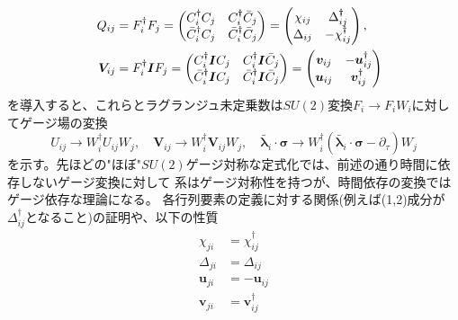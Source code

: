 \documentclass[11pt, aps, longbibliography]{article}
\begin{document}
        \begin{align}\label{eq:highS-MF-16}
            Q_{ij} &= F_i^\dagger F_j =\begin{pmatrix}
                C_i^\dagger C_j & C_i^\dagger\bar{C}_j \\
                \bar{C}_i^\dagger C_j & \bar{C}_i^\dagger \bar{C}_j
            \end{pmatrix} = \begin{pmatrix}
                \chi_{ij} & \Delta^\dagger_{ij} \\
                \Delta_{ij} & -\chi^\dagger_{ij}
            \end{pmatrix}, \notag \\
            \quad \boldsymbol{V}_{ij} &= F_i^\dagger \boldsymbol{I}F_j = \begin{pmatrix}
                C_i^\dagger \boldsymbol{I}C_j & C_i^\dagger \boldsymbol{I}\bar{C}_j \\
                \bar{C}_i^\dagger \boldsymbol{I}C_j & \bar{C}_i^\dagger \boldsymbol{I}\bar{C}_j
            \end{pmatrix} = \begin{pmatrix}
                \boldsymbol{v}_{ij} & -\boldsymbol{u}_{ij}^\dagger \\ 
                \boldsymbol{u}_{ij} & \boldsymbol{v}_{ij}^\dagger
            \end{pmatrix}
        \end{align}
        を導入すると、これらとラグランジュ未定乗数は$SU(2)$変換$F_i\rightarrow F_iW_i$に対してゲージ場の変換
        \begin{equation}\label{eq:highS-MF-17}
            U_{ij} \rightarrow W_i^\dagger U_{ij} W_j, \quad \boldsymbol{V}_{ij} \rightarrow W_i^\dagger \boldsymbol{V}_{ij} W_j, \quad \tilde{\boldsymbol{\lambda}_i}\cdot \boldsymbol{\sigma} \rightarrow W_i^\dagger \left( \tilde{\boldsymbol{\lambda}_i}\cdot \boldsymbol{\sigma} - \partial_\tau \right) W_j
        \end{equation}を示す。先ほどの"ほぼ"$SU(2)$ゲージ対称な定式化では、前述の通り時間に依存しないゲージ変換に対して
        系はゲージ対称性を持つが、時間依存の変換ではゲージ依存な理論になる。
        各行列要素の定義に対する関係(例えば(1,2)成分が$\Delta_{ij}^\dagger$となること)の証明や、以下の性質
        \begin{align}\label{eq:highS-MF-18}
            \chi_{ji} &= \chi_{ij}^\dagger \\
            \Delta_{ji} &= \Delta_{ij} \\
            \boldsymbol{u}_{ji} &= -\boldsymbol{u}_{ij} \\
            \boldsymbol{v}_{ji} &=\boldsymbol{v}_{ij}^\dagger 
        \end{align}
\end{document}
